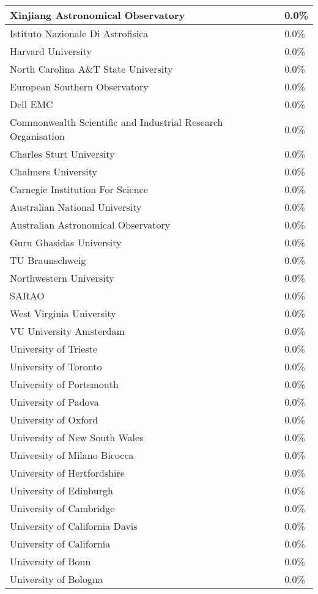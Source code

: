 \documentclass{article}%
\begin{document}
\begin{longtabu}{X[l] X[r]}
\hline%
Xinjiang Astronomical Observatory&0.0\%\\%
\hline%
Istituto Nazionale Di Astrofisica&0.0\%\\%
\hline%
Harvard University&0.0\%\\%
\hline%
North Carolina A\&T State University&0.0\%\\%
\hline%
European Southern Observatory&0.0\%\\%
\hline%
Dell EMC&0.0\%\\%
\hline%
Commonwealth Scientific and Industrial Research Organisation&0.0\%\\%
\hline%
Charles Sturt University&0.0\%\\%
\hline%
Chalmers University&0.0\%\\%
\hline%
Carnegie Institution For Science&0.0\%\\%
\hline%
Australian National University&0.0\%\\%
\hline%
Australian Astronomical Observatory&0.0\%\\%
\hline%
Guru Ghasidas University&0.0\%\\%
\hline%
TU Braunschweig&0.0\%\\%
\hline%
Northwestern University&0.0\%\\%
\hline%
SARAO&0.0\%\\%
\hline%
West Virginia University&0.0\%\\%
\hline%
VU University Amsterdam&0.0\%\\%
\hline%
University of Trieste&0.0\%\\%
\hline%
University of Toronto&0.0\%\\%
\hline%
University of Portsmouth&0.0\%\\%
\hline%
University of Padova&0.0\%\\%
\hline%
University of Oxford&0.0\%\\%
\hline%
University of New South Wales&0.0\%\\%
\hline%
University of Milano Bicocca&0.0\%\\%
\hline%
University of Hertfordshire&0.0\%\\%
\hline%
University of Edinburgh&0.0\%\\%
\hline%
University of Cambridge&0.0\%\\%
\hline%
University of California Davis&0.0\%\\%
\hline%
University of California&0.0\%\\%
\hline%
University of Bonn&0.0\%\\%
\hline%
University of Bologna&0.0\%\\%

\end{longtabu}
\end{document}
